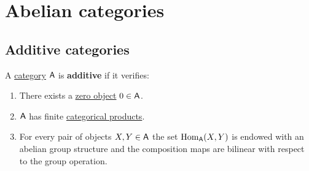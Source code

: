 \documentclass[../../../main]{subfiles}
\begin{document}
\section{Abelian categories}

\subsection{Additive categories}
\begin{definition} \label{def:additive-category}
  A \hyperref[def:category]{category} \(\mathsf{A}\) is \textbf{additive} if it verifies:
  \begin{enumerate}[label=A.\arabic*), ref=A.\arabic*]
    \item\label{axiom:additive-zero} There exists a \hyperref[def:zero-object]{zero object} \(0 \in \mathsf{A}\).
    \item\label{axiom:additive-products} \(\mathsf{A}\) has finite \hyperref[def:categorical-product]{categorical products}.
    \item\label{axiom:additive-hom} For every pair of objects \(X, Y \in \mathsf{A}\) the set \(\operatorname{Hom}_{\mathsf{A}}(X, Y)\) is endowed with an abelian group structure and the composition maps are bilinear with respect to the group operation.
  \end{enumerate}
\end{definition}
\end{document}
